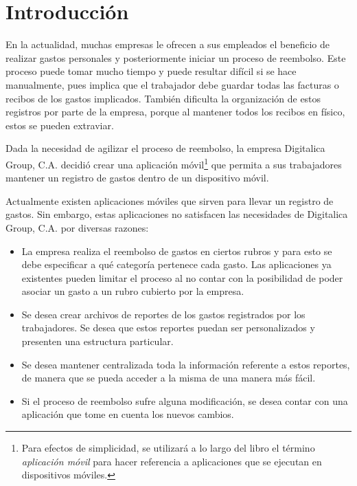 \chapter*{Introducción} \label{sec:Introduccion}

\vspace{5 mm}
En la actualidad, muchas empresas le ofrecen a sus empleados el beneficio de realizar gastos personales y posteriormente iniciar un proceso de reembolso. Este proceso puede tomar mucho tiempo y puede resultar difícil si se hace manualmente, pues implica que el trabajador debe guardar todas las facturas o recibos de los gastos implicados. También dificulta la organización de estos registros por parte de la empresa, porque al mantener todos los recibos en físico, estos se pueden extraviar. 

Dada la necesidad de agilizar el proceso de reembolso, la empresa Digitalica Group, C.A. decidió crear una aplicación móvil\footnote{Para efectos de simplicidad, se utilizará a lo largo del libro el término \textit{aplicación móvil} para hacer referencia a aplicaciones que se ejecutan en dispositivos móviles.} que permita a sus trabajadores mantener un registro de gastos dentro de un dispositivo móvil.

Actualmente existen aplicaciones móviles que sirven para llevar un registro de gastos. Sin embargo, estas aplicaciones no satisfacen las necesidades de Digitalica Group, C.A. por diversas razones:

\begin{itemize}
\item La empresa realiza el reembolso de gastos en ciertos rubros y para esto se debe especificar a qué categoría pertenece cada gasto. Las aplicaciones ya existentes pueden limitar el proceso al no contar con la posibilidad de poder asociar un gasto a un rubro cubierto por la empresa.
\item Se desea crear archivos de reportes de los gastos registrados por los trabajadores. Se desea que estos reportes puedan ser personalizados y presenten una estructura particular.
\item Se desea mantener centralizada toda la información referente a estos reportes, de manera que se pueda acceder a la misma de una manera más fácil.
\item Si el proceso de reembolso sufre alguna modificación, se desea contar con una aplicación que tome en cuenta los nuevos cambios.
\end{itemize}

